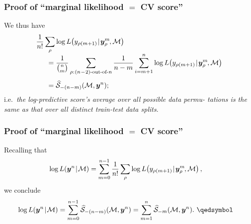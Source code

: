 \documentclass[18pt, handout]{beamer}
\newcommand{\defineTightSpacing}{%
	\setlength{\abovedisplayskip}{.25\baselineskip}%
	\setlength{\belowdisplayskip}{.25\baselineskip}%
}
\newcommand{\given}{\thinnerspace | \thinnerspace}
\newcommand{\spacedColon}{\mkern .5mu : \mkern 1mu}
\newcommand{\thinnerspace}{\mskip.5\thinmuskip}
\newcommand{\negthinnerspace}{\mskip-.5\thinmuskip}
\newcommand{\likelihood}{L}
\newcommand{\by}{\bm{y}}
\newcommand{\score}{\mathcal{S}}
\newcommand{\modelSymbol}{\mathcal{M}}
\newcommand{\permutation}{\rho}
\newcommand{\trainingSize}{m}
\newcommand{\testSampleIndex}{i}
\begin{document}
\begin{frame}
\frametitle{Proof of ``marginal likelihood $=$ {\large CV} score''}
We thus have
\begin{equation*} %
\begin{aligned}
&\frac{1}{n!} \sum_\permutation \log \likelihood\!\left(y_{\permutation(\trainingSize + 1)} \given \by_\permutation^\trainingSize\negthinnerspace, \modelSymbol \right) \\[-.25\baselineskip]
&\hspace*{1.5em}= \frac{1}{{n \choose \trainingSize}} \sum_{\permutation \spacedColon \text{$(n\!-\!2)$-out-of-$n$}} 
	\frac{1}{n - \trainingSize} \sum_{\testSampleIndex = \trainingSize + 1}^n
		\log \likelihood\!\left(y_{\permutation(\trainingSize + 1)} \given \by_\permutation^\trainingSize\negthinnerspace, \modelSymbol \right) \\[.25\baselineskip]
&\hspace*{1.5em}= \widehat{\score}_{-(n - m)}(\modelSymbol, \by^n);
\end{aligned}
\end{equation*}
i.e.\ \textit{the log-predictive score's average over all possible data permu- tations is the same as that over all distinct train-test data splits}.
\end{frame}


\begin{frame}
\frametitle{Proof of ``marginal likelihood $=$ {\large CV} score''}
Recalling that
\begin{equation*} \defineTightSpacing%
\begin{aligned}
\log \likelihood(\by^n \given \modelSymbol)
	&= \sum_{m = 0}^{n - 1} \frac{1}{n!} \sum_\permutation  \log \likelihood\!\left(y_{\permutation(\trainingSize + 1)} \given \by_\permutation^\trainingSize\negthinnerspace, \modelSymbol \right),
\end{aligned}
\end{equation*}
we conclude
\begin{equation*} \defineTightSpacing%
\begin{aligned}
\log \likelihood(\by^n \given \modelSymbol)
	&= \sum_{m = 0}^{n - 1} \widehat{\score}_{-(n - m)}(\modelSymbol, \by^n)
	= \sum_{m = 1}^{n} \widehat{\score}_{-m}(\modelSymbol, \by^n). \ \qedsymbol
\end{aligned}
\end{equation*}
\end{frame}




\end{document}
